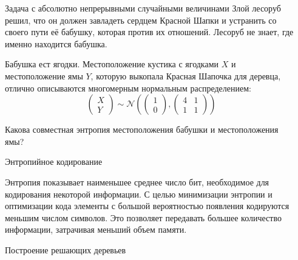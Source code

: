 \documentclass[final]{beamer}
\newlength{\onecolwid}
\newlength{\twocolwid}
\begin{document}
\begin{frame}[t]
\begin{columns}[t]
\begin{column}{\twocolwid}
\begin{columns}[t,totalwidth=\twocolwid]
\begin{column}{\onecolwid}
\end{column} %

\begin{column}{\onecolwid}\vspace{-.6in} %

\begin{alertblock}{Задача с абсолютно непрерывными случайными величинами}
	Злой лесоруб решил, что он должен завладеть сердцем Красной Шапки и устранить со своего пути её бабушку, которая против их отношений. Лесоруб не знает, где именно находится бабушка.

Бабушка ест ягодки. Местоположение кустика с ягодками $X$ и местоположение ямы $Y$, которую выкопала Красная Шапочка для деревца, отлично описываются многомерным нормальным распределением:
\[\begin{pmatrix} 
    X \\ 
    Y 
  \end{pmatrix}\sim \mathcal{N}\left(\begin{pmatrix} 
      1 \\ 
      0
    \end{pmatrix},
    \begin{pmatrix} 
      4 & 1 \\ 
      1 & 1
    \end{pmatrix}\right)\]

Какова совместная энтропия местоположения бабушки и местоположения ямы?
\end{alertblock}

\begin{block}{Энтропийное кодирование}


Энтропия показывает наименьшее среднее число бит, необходимое для кодирования некоторой информации. С целью минимизации энтропии и оптимизации кода элементы с большой вероятностью появления кодируются меньшим числом символов. Это позволяет передавать большее количество информации, затрачивая меньший объем памяти.
\end{block}
\begin{block}{Построение решающих деревьев}


\end{block}
\end{column}
\end{columns}
\end{column}
\end{columns}
\end{frame}
\end{document}
